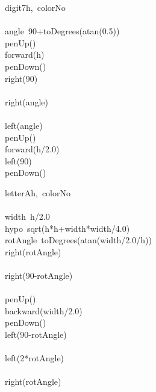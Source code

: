 \documentclass[a4paper,10pt]{article}
\begin{document}
\begin{pseudocode}{digit7}{h,\ colorNo }
\label{digit7}
\\
\\
  angle\gets\ 90+toDegrees(atan(0.5))\\
  penUp()\\
  forward(h)\\
  penDown()\\
  right(90)\\
  \\
  right(angle)\\
  \\
  left(angle)\\
  penUp()\\
  forward(h/2.0)\\
  left(90)\\
  penDown()\\
\ENDPROCEDURE
\end{pseudocode}


\begin{pseudocode}{letterA}{h,\ colorNo }
\label{letterA}
\\
\\
  width\gets\ h/2.0\\
  hypo\gets\ sqrt(h*h+width*width/4.0)\\
  rotAngle\gets\ toDegrees(atan(width/2.0/h))\\
  right(rotAngle)\\
  \\
  right(90-rotAngle)\\
  \\
  penUp()\\
  backward(width/2.0)\\
  penDown()\\
  left(90-rotAngle)\\
  \\
  left(2*rotAngle)\\
  \\
  right(rotAngle)\\
\ENDPROCEDURE
\end{pseudocode}
\end{document}
